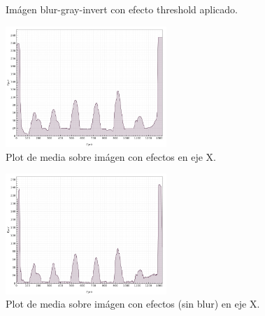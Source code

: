 \begin{figure}[H]
	  \vspace{-0.2cm}
	  \centering
	  \centering
	  \vspace{-0.4cm}
	  \caption{Im\'agen blur-gray-invert con efecto threshold aplicado.}
	  \label{fig:font-thresh}
	  \vspace{-0.15cm}
\end{figure}
\begin{figure}[H]
	  \vspace{-0.2cm}
	  \centering
	  \includegraphics[width=230px]{imagenes-jtlc/experimento/search-cut-points/plot-x}
	  \centering
	  \vspace{-0.4cm}
	  \caption{Plot de media sobre im\'agen con efectos en eje X.}
	  \label{fig:font-sc-plot-x}
	  \vspace{-0.15cm}
\end{figure}
\begin{figure}[H]
	  \vspace{-0.2cm}
	  \centering
	  \includegraphics[width=230px]{imagenes-jtlc/experimento/search-cut-points/plot-x-no-blur}
	  \centering
	  \vspace{-0.4cm}
	  \caption{Plot de media sobre im\'agen con efectos (sin blur) en eje X.}
	  \label{fig:font-sc-plot-x-s-blur}
	  \vspace{-0.15cm}
\end{figure}
